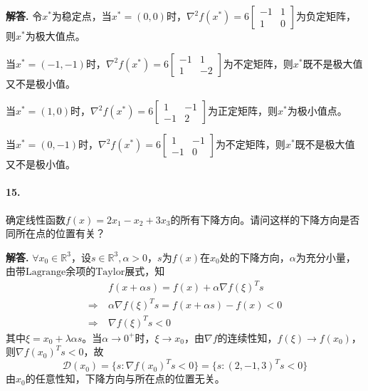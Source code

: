 \documentclass[12pt, a4paper, oneside]{ctexart}
\newenvironment{solution}{\par\noindent\textbf{解答. }}{\bigskip\par}
\begin{document}
\begin{solution}
    令$x^*$为稳定点，当$x^*= (0, 0)$时，$\nabla^2f(x^*)=6\left[\begin{matrix}
        -1&1\\1&0
    \end{matrix}\right]$为负定矩阵，则$x^*$为极大值点。

    当$x^*= (-1, -1)$时，$\nabla^2f(x^*)=6\left[\begin{matrix}
        -1&1\\1&-2
    \end{matrix}\right]$为不定矩阵，则$x^*$既不是极大值又不是极小值。

    当$x^*= (1, 0)$时，$\nabla^2f(x^*)=6\left[\begin{matrix}
        1&-1\\-1&2
    \end{matrix}\right]$为正定矩阵，则$x^*$为极小值点。

    当$x^*= (0, -1)$时，$\nabla^2f(x^*)=6\left[\begin{matrix}
        1&-1\\-1&0
    \end{matrix}\right]$为不定矩阵，则$x^*$既不是极大值又不是极小值。
\end{solution}
\paragraph{15.}确定线性函数$f(x)=2x_1-x_2+3x_3$的所有下降方向。请问这样的下降方向是否同所在点的位置有关？
\begin{solution}
    $\forall x_0\in \mathbb{R}^3$，设$s\in\mathbb{R}^3,\alpha > 0$，$s$为$f(x)$在$x_0$处的下降方向，$\alpha$为充分小量，由带$\text{Lagrange}$余项的$\text{Taylor}$展式，知
    \begin{equation*}
        \begin{aligned}
            &\ f(x+\alpha s) = f(x)+\alpha\nabla f(\xi)^Ts\\
            \Rightarrow&\ \alpha\nabla f(\xi)^Ts = f(x+\alpha s)-f(x) < 0\\
            \Rightarrow&\ \nabla f(\xi)^Ts < 0
        \end{aligned}
    \end{equation*}
    其中$\xi = x_0+\lambda \alpha s$。当$\alpha\rightarrow 0^+$时，$\xi\rightarrow x_0$，由$\nabla f$的连续性知，$f(\xi)\rightarrow f(x_0)$，则$\nabla f(x_0)^T s < 0$，故
    \begin{equation*}
        \mathcal{D}(x_0) = \{s:\nabla f(x_0)^Ts < 0\} = \{s:(2,-1,3)^Ts < 0\}
    \end{equation*}
    由$x_0$的任意性知，下降方向与所在点的位置无关。
\end{solution}
\end{document}
